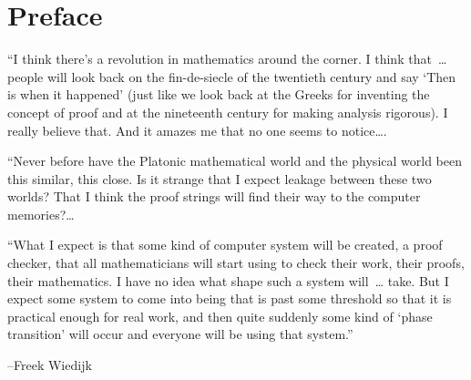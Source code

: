 
\chapter*{Preface}


%
%
%




{

\narrower

{\it

  ``I think there's a revolution in mathematics around the corner. I
  think that~\dots{}   %
  people will look back on the fin-de-siecle of the twentieth century
  and say `Then is when it happened' (just like we look back at the
  Greeks for inventing the concept of proof and at the nineteenth
  century for making analysis rigorous). I really believe that. And it
  amazes me that no one seems to notice\dots.

  ``Never before have the Platonic mathematical world and the physical
  world been this similar, this close. Is it strange that I expect
  leakage between these two worlds? That I think the proof strings
  will find their way to the computer memories?\dots 

  ``What I expect is that some kind of computer system will be
  created, a proof checker, that all mathematicians will start using
  to check their work, their proofs, their mathematics. I have no idea
  what shape such a system will~\dots{}  take. But I expect some
  system to come into being that is past some threshold so that it is
  practical enough for real work, and then quite suddenly some kind of
  `phase transition' will occur and everyone will be using that
  system.''

{\hfill--Freek Wiedijk \cite{FWR}} %

}

}

